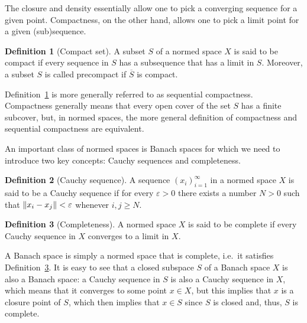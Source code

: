\documentclass[english, 12pt, a4paper, sci, utf8, a-2b, online]{aaltothesis}
\theoremstyle{definition}
\newtheorem{definition}{Definition}[section]
\theoremstyle{plain}
\DeclarePairedDelimiter\norm{\lVert}{\rVert}
\numberwithin{equation}{section}
\begin{document}
The closure and density essentially allow one to pick a converging sequence
for a given point. Compactness, on the other hand, allows one to pick
a limit point for a given (sub)sequence.
\begin{definition}[Compact set]
    \label{def:compactsubset}
    A subset $S$ of a normed space $X$ is said to be compact if every sequence
    in $S$ has a subsequence that has a limit in $S$.
    Moreover, a subset $S$ is called precompact if $\overline{S}$
    is compact.
\end{definition}
Definition~\ref{def:compactsubset} is more generally referred to as
sequential compactness. Compactness generally means that every open cover of the
set $S$ has a finite subcover, but, in normed spaces, the more general definition of
compactness and sequential compactness are equivalent.

An important class of normed spaces is Banach spaces for which we need
to introduce two key concepts: Cauchy sequences and completeness.
\begin{definition}[Cauchy sequence]
    \label{def:cauchysequence}
    A sequence $(x_i)_{i=1}^{\infty}$ in a normed space $X$ is said to be
    a Cauchy sequence if for every $\varepsilon > 0$ there exists
    a number $N > 0$ such that
    $\norm{x_i - x_j} < \varepsilon$ whenever $i,j \geq N$.
\end{definition}
\begin{definition}[Completeness]
    \label{def:completeness}
    A normed space $X$ is said to be complete if every Cauchy sequence in $X$
    converges to a limit in $X$.
\end{definition}
A Banach space is simply a normed space that is complete, i.e.\ it
satisfies Definition~\ref{def:completeness}.
It is easy to see that a closed subspace $S$ of a Banach space $X$ is also
a Banach space: a Cauchy sequence in $S$ is also a Cauchy sequence in $X$,
which means that it converges to some point $x \in X$, but this implies
that $x$ is a closure point of $S$, which then implies that $x \in S$
since $S$ is closed and, thus, $S$ is complete.
\end{document}
